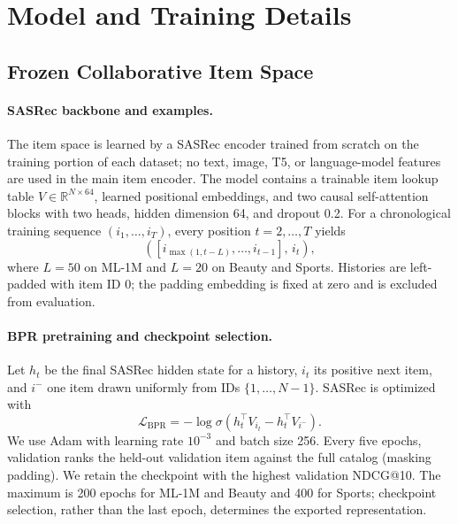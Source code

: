 \documentclass[letterpaper]{article}
\begin{document}
\section{Model and Training Details}
\label{app:training}

\subsection{Frozen Collaborative Item Space}
\label{app:item-encoder}

\paragraph{SASRec backbone and examples.}
The item space is learned by a SASRec encoder trained from scratch on the
training portion of each dataset; no text, image, T5, or language-model
features are used in the main item encoder.  The model contains a trainable
item lookup table \(V\in\mathbb{R}^{N\times64}\), learned positional
embeddings, and two causal self-attention blocks with two heads, hidden
dimension 64, and dropout 0.2.  For a chronological training sequence
\((i_1,\ldots,i_T)\), every position \(t=2,\ldots,T\) yields
\[
  ([i_{\max(1,t-L)},\ldots,i_{t-1}],\,i_t),
\]
where \(L=50\) on ML-1M and \(L=20\) on Beauty and Sports.  Histories are
left-padded with item ID 0; the padding embedding is fixed at zero and is
excluded from evaluation.

\paragraph{BPR pretraining and checkpoint selection.}
Let \(h_t\) be the final SASRec hidden state for a history, \(i_t\) its
positive next item, and \(i^-\) one item drawn uniformly from IDs
\(\{1,\ldots,N-1\}\).  SASRec is optimized with
\[
  \mathcal L_{\mathrm{BPR}}
  =-\log\sigma(h_t^\top V_{i_t}-h_t^\top V_{i^-}).
\]
We use Adam with learning rate \(10^{-3}\) and batch size 256.  Every five
epochs, validation ranks the held-out validation item against the full
catalog (masking padding).  We retain the checkpoint with the highest
validation NDCG@10.  The maximum is 200 epochs for ML-1M and Beauty and 400
for Sports; checkpoint selection, rather than the last epoch, determines the
exported representation.
\end{document}
